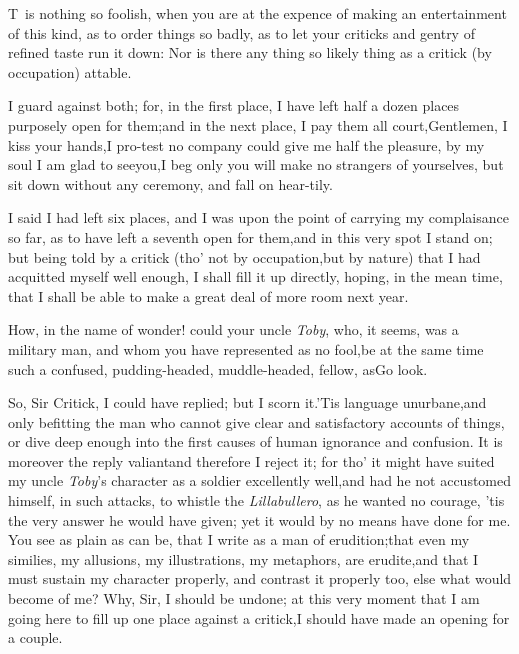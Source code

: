 \documentclass{article}
\begin{document}
\lettrine{T}{\,} is nothing so foolish, when you
are at the expence of making an entertainment of this kind, as to
order things so badly, as to let your criticks and gentry of
refined taste run it down: Nor is there any thing so likely
thing as a critick (by occupation) at\break table.

\tsh I guard against both; for, in the first place, I have left
half a dozen places purposely open for them;\tsk and in the next
place, I pay them all court,\tsk\break Gentlemen, I kiss your
hands,\tsh I pro-\break test no company could give me half the pleasure,\tsk
by my soul I am glad to see\break you,\tsh I beg only you will make no
strangers of yourselves, but sit down without any ceremony, and
fall on hear-\break tily.\\\newpage

I said I had left six places, and I was upon the point of
carrying my complaisance so far, as to have left a seventh open for
them,\tsk and in this very spot I stand on; but being told by a
critick (tho’ not by occupation,\tsk but by nature) that I
had acquitted myself well enough, I shall fill it up directly,
hoping, in the mean time, that I shall be able to make a great deal
of more room next year.

\tsh How, in the name of wonder! could your
uncle \textit{Toby}, who, it seems, was a military man, and whom you
have represented as no fool,\tsk be at the same time such a
confused, pudding-headed, muddle-headed, fellow, as\tsk Go
look.

So, Sir Critick, I could have replied; but I scorn it.\tsh ’Tis
language un\-urbane,\tsk and only befitting the man who
cannot give clear and satisfactory accounts of things, or dive
deep enough into the first causes of human ignorance and
confusion. It is moreover the reply valiant\tsk and therefore I
reject it; for tho’ it might have suited my uncle
\textit{Toby}’s character as a soldier excellently well,\tsk and
had he not accustomed himself, in such attacks, to whistle the
\textit{Lilla\-bullero}, as he wanted no courage, ’tis the very
answer he would have given; yet it would by no means have done
for me. You see as plain as can be, that I write as a man of
erudition;\tsk that even my similies, my allusions, my
illustrations, my metaphors, are erudite,\tsk and that I must
sustain my character properly, and contrast it properly too,\tsk
else what would become of me? 
Why, Sir, I should be undone;\tsk
at this very moment that I am going here to fill up one place
against a critick,\tsk I should have made an opening for a
couple.
\end{document}
